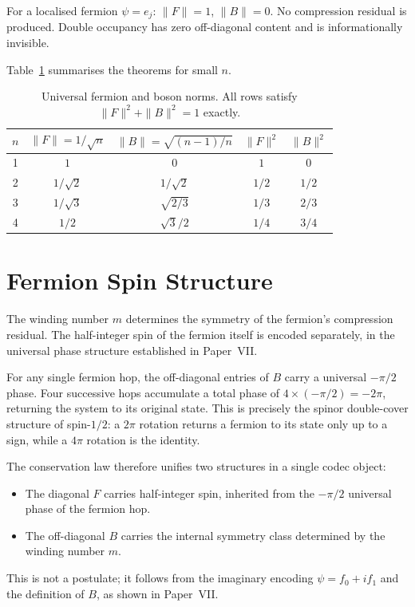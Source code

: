 \documentclass[11pt]{article}
\begin{document}
\begin{corollary}
For a localised fermion $\psi = e_j$: $\|F\| = 1$, $\|B\| = 0$.
No compression residual is produced.
Double occupancy has zero off-diagonal content and is
informationally invisible.
\end{corollary}

Table~\ref{tab:norms} summarises the theorems for small $n$.

\begin{table}[h]
\centering
\begin{tabular}{ccccc}
\toprule
$n$ & $\|F\| = 1/\sqrt{n}$ & $\|B\| = \sqrt{(n-1)/n}$
    & $\|F\|^2$ & $\|B\|^2$ \\
\midrule
1 & $1$          & $0$          & $1$   & $0$   \\
2 & $1/\sqrt{2}$ & $1/\sqrt{2}$ & $1/2$ & $1/2$ \\
3 & $1/\sqrt{3}$ & $\sqrt{2/3}$ & $1/3$ & $2/3$ \\
4 & $1/2$        & $\sqrt{3}/2$ & $1/4$ & $3/4$ \\
\bottomrule
\end{tabular}
\caption{Universal fermion and boson norms.
All rows satisfy $\|F\|^2 + \|B\|^2 = 1$ exactly.}
\label{tab:norms}
\end{table}

\section{Fermion Spin Structure}
\label{sec:halfinteger}

The winding number $m$ determines the symmetry of the fermion's
compression residual.
The half-integer spin of the fermion itself is encoded separately,
in the universal phase structure established in Paper~VII.

For any single fermion hop, the off-diagonal entries of $B$ carry a
universal $-\pi/2$ phase.
Four successive hops accumulate a total phase of $4 \times (-\pi/2)
= -2\pi$, returning the system to its original state.
This is precisely the spinor double-cover structure of spin-$1/2$:
a $2\pi$ rotation returns a fermion to its state only up to a sign,
while a $4\pi$ rotation is the identity.

The conservation law therefore unifies two structures in a single
codec object:
\begin{itemize}
  \item The diagonal $F$ carries half-integer spin, inherited from
        the $-\pi/2$ universal phase of the fermion hop.
  \item The off-diagonal $B$ carries the internal symmetry class
        determined by the winding number $m$.
\end{itemize}
This is not a postulate; it follows from the imaginary encoding
$\psi = f_0 + if_1$ and the definition of $B$, as shown in Paper~VII.
\end{document}
